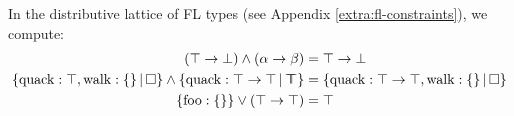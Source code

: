 


\begin{example}
    In the distributive lattice of FL types (see Appendix \ref{extra:fl-constraints}), we compute:
    \begin{align*}
        (\top \to \bot) \meet (\alpha \to \beta) &= \top \to \bot \\ 
        \flext{\mathrm{quack} : \top, \mathrm{walk} : \flrec{}}{\flabsent} \meet \flext{\mathrm{quack} : \top \to \top}{\flftop} &= \flext{\mathrm{quack}: \top \to \top, \mathrm{walk}: \flrec{}}{\flabsent} \\ 
        \flrec{\mathrm{foo}: \flrec{}} \join (\top \to \top) &= \top
    \end{align*}
\end{example}


